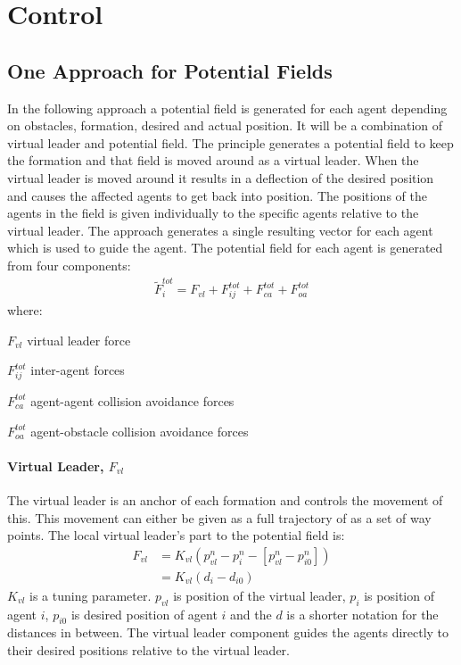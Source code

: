 \chapter{Control}
\label{ch:control}




\section{One Approach for Potential Fields}
In the following approach a potential field is generated for each
agent depending on obstacles, formation, desired and actual position.
It will be a combination of virtual leader and potential field. The
principle generates a potential field to keep the formation and that
field is moved around as a virtual leader. When the virtual leader is
moved around it results in a deflection of the desired position and
causes the affected agents to get back into position. The positions of
the agents in the field is given individually to the specific agents
relative to the virtual leader. The approach generates a single
resulting vector for each agent which is used to guide the agent. The
potential field for each agent is generated from four components:
\begin{align}
\tilde{F}_i^{tot} = F_{vl}+F_{ij}^{tot}+F_{ca}^{tot}+F_{oa}^{tot}
\end{align}
where:
\begin{ffk}
\firmlist%
\item[$F_{vl}$] virtual leader force
\item[$F_{ij}^{tot}$] inter-agent forces
\item[$F_{ca}^{tot}$] agent-agent collision avoidance forces
\item[$F_{oa}^{tot}$] agent-obstacle collision avoidance forces
\end{ffk}

\subsubsection{Virtual Leader, $F_{vl}$}
The virtual leader is an anchor of each formation and controls the movement of this. This movement can either be given as a full trajectory of as a set of way points. The local virtual leader's part to the potential field is:
\begin{align}
F_{vl} &= K_{vl}(p_{vl}^n-p_i^n-[p_{vl}^n-p_{i0}^n])\\
&= K_{vl}(d_i-d_{i0})
\end{align}
$K_{vl}$ is a tuning parameter. $p_{vl}$ is position of the virtual leader, $p_i$ is position of agent $i$, $p_{i0}$ is desired position of agent $i$ and the $d$ is a shorter notation for the distances in between. The virtual leader component guides the agents directly to their desired positions relative to the virtual leader.


